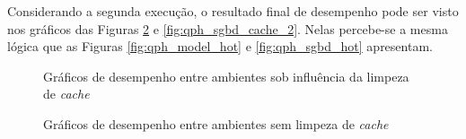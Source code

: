 Considerando a segunda execução, o resultado final de desempenho pode ser visto nos gráficos das Figuras \ref{fig:qph_model_cache_2} e \ref{fig:qph_sgbd_cache_2}. Nelas percebe-se a mesma lógica que as Figuras \ref{fig:qph_model_hot} e \ref{fig:qph_sgbd_hot} apresentam.

\begin{figure}[htpb]
        \centering
        \caption{Gráficos de desempenho entre ambientes sob influência da limpeza de \textit{cache}}
        \label{fig:qph_model_cache}
\end{figure}

\begin{figure}[t]
        \centering
        \caption{Gráficos de desempenho entre ambientes sem limpeza de \textit{cache}}
        \label{fig:qph_model_cache_2}
\end{figure}

